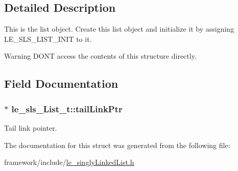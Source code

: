\subsection{Detailed Description}
This is the list object. Create this list object and initialize it by assigning L\+E\+\_\+\+S\+L\+S\+\_\+\+L\+I\+S\+T\+\_\+\+I\+N\+IT to it.

\begin{DoxyWarning}{Warning}
D\+ON\textquotesingle{}T access the contents of this structure directly. 
\end{DoxyWarning}


\subsection{Field Documentation}
\subsubsection[{\texorpdfstring{tail\+Link\+Ptr}{tailLinkPtr}}]{$\ast$ le\+\_\+sls\+\_\+\+List\+\_\+t\+::tail\+Link\+Ptr}\hypertarget{structle__sls___list__t_a696f83142673b69689c6dcf750a09e4a}{}\label{structle__sls___list__t_a696f83142673b69689c6dcf750a09e4a}


Tail link pointer. 



The documentation for this struct was generated from the following file\+:\begin{DoxyCompactItemize}
\item 
framework/include/\hyperlink{le__singly_linked_list_8h}{le\+\_\+singly\+Linked\+List.\+h}\end{DoxyCompactItemize}
